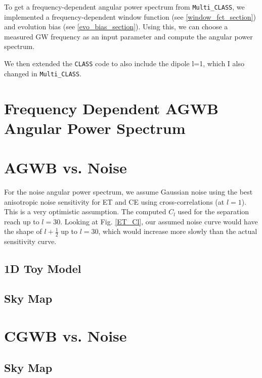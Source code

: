 

To get a frequency-dependent angular power spectrum from {\tt Multi\_CLASS}, we implemented a frequency-dependent window function (see \ref{window_fct_section}) and evolution bias (see \ref{evo_bias_section}). Using this, we can choose a measured GW frequency as an input parameter and compute the angular power spectrum.

We then extended the {\tt CLASS} code to also include the dipole l=1, which I also changed in {\tt Multi\_CLASS}.
\section{Frequency Dependent AGWB Angular Power Spectrum}
\section{AGWB vs. Noise}
For the noise angular power spectrum, we assume Gaussian noise using the best anisotropic noise sensitivity for ET and CE using cross-correlations (at $l=1$). This is a very optimistic assumption. The computed $C_l$ used for the separation reach up to $l=30$. Looking at Fig. \ref{ET_Cl}, our assumed noise curve would have the shape of $l+\frac{1}{2}$ up to $l=30$, which would increase more slowly than the actual sensitivity curve. 
\subsection{1D Toy Model}
\subsection{Sky Map}
\section{CGWB vs. Noise}
\subsection{Sky Map}